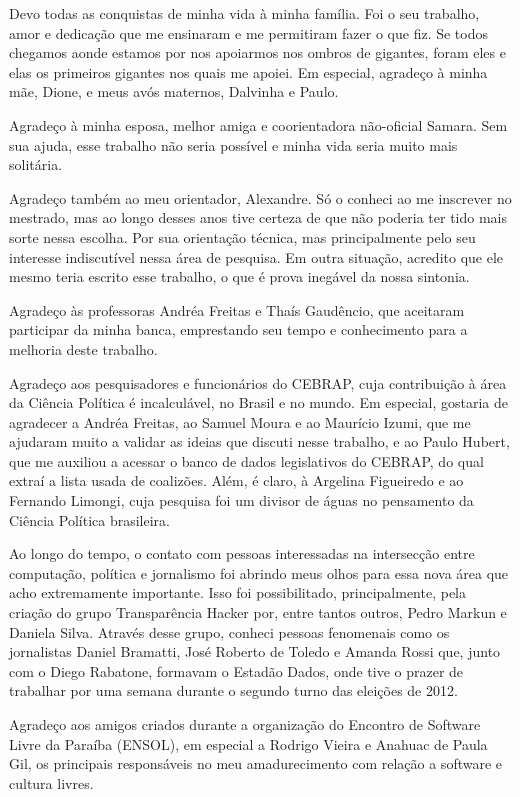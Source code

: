 Devo todas as conquistas de minha vida à minha família. Foi o seu trabalho,
amor e dedicação que me ensinaram e me permitiram fazer o que fiz. Se todos
chegamos aonde estamos por nos apoiarmos nos ombros de gigantes, foram eles e
elas os primeiros gigantes nos quais me apoiei. Em especial, agradeço à minha
mãe, Dione, e meus avós maternos, Dalvinha e Paulo.

Agradeço à minha esposa, melhor amiga e coorientadora não-oficial Samara. Sem
sua ajuda, esse trabalho não seria possível e minha vida seria muito mais
solitária.

Agradeço também ao meu orientador, Alexandre. Só o conheci ao me inscrever no
mestrado, mas ao longo desses anos tive certeza de que não poderia ter tido
mais sorte nessa escolha. Por sua orientação técnica, mas principalmente pelo
seu interesse indiscutível nessa área de pesquisa. Em outra situação, acredito
que ele mesmo teria escrito esse trabalho, o que é prova inegável da nossa
sintonia.

Agradeço às professoras Andréa Freitas e Thaís Gaudêncio, que aceitaram
participar da minha banca, emprestando seu tempo e conhecimento para a melhoria
deste trabalho.

Agradeço aos pesquisadores e funcionários do \gls{CEBRAP}, cuja contribuição à
área da Ciência Política é incalculável, no Brasil e no mundo. Em especial,
gostaria de agradecer a Andréa Freitas, ao Samuel Moura e ao Maurício Izumi, que 
me ajudaram muito a validar as ideias que discuti nesse trabalho, e ao Paulo
Hubert, que me auxiliou a acessar o banco de dados legislativos do
\gls{CEBRAP}, do qual extraí a lista usada de coalizões. Além, é claro, à
Argelina Figueiredo e ao Fernando Limongi, cuja pesquisa foi um divisor de águas
no pensamento da Ciência Política brasileira.

Ao longo do tempo, o contato com pessoas interessadas na intersecção entre
computação, política e jornalismo foi abrindo meus olhos para essa nova área
que acho extremamente importante. Isso foi possibilitado, principalmente,
pela criação do grupo Transparência Hacker por, entre tantos outros, Pedro
Markun e Daniela Silva. Através desse grupo, conheci pessoas fenomenais como os
jornalistas Daniel Bramatti, José Roberto de Toledo e Amanda Rossi que, junto
com o Diego Rabatone, formavam o Estadão Dados, onde tive o prazer de trabalhar
por uma semana durante o segundo turno das eleições de 2012.

Agradeço aos amigos criados durante a organização do Encontro de Software Livre
da Paraíba (ENSOL), em especial a Rodrigo Vieira e Anahuac de Paula Gil, os
principais responsáveis no meu amadurecimento com relação a software e cultura
livres.


